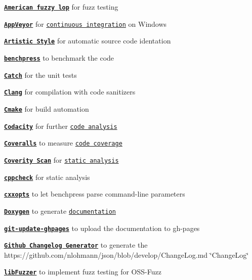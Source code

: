 \begin{DoxyItemize}
\item \href{http://lcamtuf.coredump.cx/afl/}{\tt {\bfseries American fuzzy lop}} for fuzz testing
\item \href{https://www.appveyor.com}{\tt {\bfseries App\+Veyor}} for \href{https://ci.appveyor.com/project/nlohmann/json}{\tt continuous integration} on Windows
\item \href{http://astyle.sourceforge.net}{\tt {\bfseries Artistic Style}} for automatic source code identation
\item \href{https://github.com/sbs-ableton/benchpress}{\tt {\bfseries benchpress}} to benchmark the code
\item \href{https://github.com/philsquared/Catch}{\tt {\bfseries Catch}} for the unit tests
\item \href{http://clang.llvm.org}{\tt {\bfseries Clang}} for compilation with code sanitizers
\item \href{https://cmake.org}{\tt {\bfseries Cmake}} for build automation
\item \href{https://www.codacy.com}{\tt {\bfseries Codacity}} for further \href{https://www.codacy.com/app/nlohmann/json}{\tt code analysis}
\item \href{https://coveralls.io}{\tt {\bfseries Coveralls}} to measure \href{https://coveralls.io/github/nlohmann/json}{\tt code coverage}
\item \href{https://scan.coverity.com}{\tt {\bfseries Coverity Scan}} for \href{https://scan.coverity.com/projects/nlohmann-json}{\tt static analysis}
\item \href{http://cppcheck.sourceforge.net}{\tt {\bfseries cppcheck}} for static analysis
\item \href{https://github.com/jarro2783/cxxopts}{\tt {\bfseries cxxopts}} to let benchpress parse command-\/line parameters
\item \href{http://www.stack.nl/~dimitri/doxygen/}{\tt {\bfseries Doxygen}} to generate \href{https://nlohmann.github.io/json/}{\tt documentation}
\item \href{https://github.com/rstacruz/git-update-ghpages}{\tt {\bfseries git-\/update-\/ghpages}} to upload the documentation to gh-\/pages
\item \href{https://github.com/skywinder/github-changelog-generator}{\tt {\bfseries Github Changelog Generator}} to generate the https\+://github.com/nlohmann/json/blob/develop/\+Change\+Log.\+md \char`\"{}\+Change\+Log\char`\"{}
\item \href{http://llvm.org/docs/LibFuzzer.html}{\tt {\bfseries lib\+Fuzzer}} to implement fuzz testing for O\+S\+S-\/\+Fuzz

\end{DoxyItemize}
